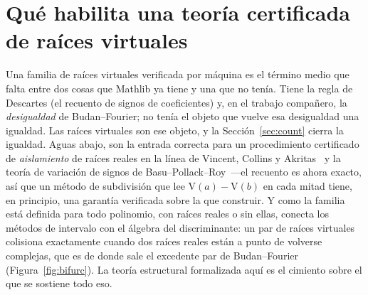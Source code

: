 \documentclass[11pt]{article}
\newcommand{\V}{\mathrm{V}}
\begin{document}
\section{Qu\'e habilita una teor\'ia certificada de ra\'ices virtuales}\label{sec:enables}

Una familia de ra\'ices virtuales verificada por m\'aquina es el t\'ermino medio que falta entre dos
cosas que Mathlib ya tiene y una que no ten\'ia. Tiene la regla de Descartes (el recuento de signos de
coeficientes) y, en el trabajo compa\~nero, la \emph{desigualdad} de Budan--Fourier; no ten\'ia el
objeto que vuelve esa desigualdad una igualdad. Las ra\'ices virtuales son ese objeto, y la
Secci\'on~\ref{sec:count} cierra la igualdad. Aguas abajo, son la entrada correcta para un
procedimiento certificado de \emph{aislamiento} de ra\'ices reales en la l\'inea de Vincent, Collins y
Akritas~\cite{vincent,collinsakritas,akritas} y la teor\'ia de variaci\'on de signos de
Basu--Pollack--Roy~\cite{bpr}---el recuento es ahora exacto, as\'i que un m\'etodo de subdivisi\'on que
lee $\V(a)-\V(b)$ en cada mitad tiene, en principio, una garant\'ia verificada sobre la que construir. Y como la familia
est\'a definida para todo polinomio, con ra\'ices reales o sin ellas, conecta los m\'etodos de
intervalo con el \'algebra del discriminante: un par de ra\'ices virtuales colisiona exactamente cuando
dos ra\'ices reales est\'an a punto de volverse complejas, que es de donde sale el excedente par de
Budan--Fourier (Figura~\ref{fig:bifurc}). La teor\'ia estructural formalizada aqu\'i es el cimiento
sobre el que se sostiene todo eso.
\end{document}
